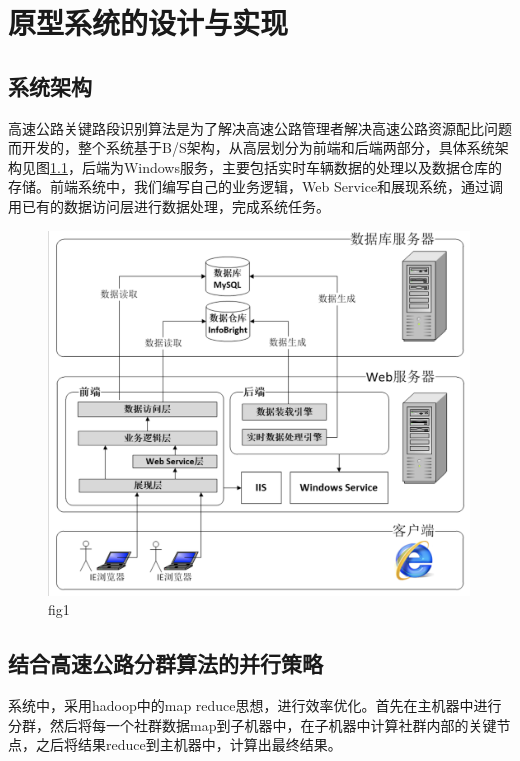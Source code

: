 
\chapter{原型系统的设计与实现}
	\section{系统架构}
		高速公路关键路段识别算法是为了解决高速公路管理者解决高速公路资源配比问题而开发的，整个系统基于B/S架构，从高层划分为前端和后端两部分，具体系统架构见图\ref{fig20}，后端为Windows服务，主要包括实时车辆数据的处理以及数据仓库的存储。前端系统中，我们编写自己的业务逻辑，Web Service和展现系统，通过调用已有的数据访问层进行数据处理，完成系统任务。

		\begin{figure}[h]
		\centering
				\begin{minipage}{0.8\linewidth}
					\centering
					\includegraphics[width=4.4in]{picture/jiagou}
					\caption{fig1}
					\label{fig20}
				\end{minipage}%
		\end{figure}
	\section{结合高速公路分群算法的并行策略}
		系统中，采用hadoop中的map reduce思想，进行效率优化。首先在主机器中进行分群，然后将每一个社群数据map到子机器中，在子机器中计算社群内部的关键节点，之后将结果reduce到主机器中，计算出最终结果。

